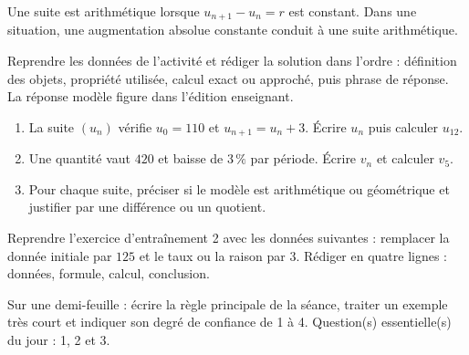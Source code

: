     \begin{traceecrite}Une suite est arithmétique lorsque $u_{n+1}-u_n=r$ est constant. Dans une situation, une augmentation absolue constante conduit à une suite arithmétique.\end{traceecrite}

    \begin{exemple}
    Reprendre les données de l'activité et rédiger la solution dans l'ordre : définition des objets, propriété utilisée, calcul exact ou approché, puis phrase de réponse. La réponse modèle figure dans l'édition enseignant.
    \end{exemple}

    \begin{exercice}[-- essentiel]
    \begin{enumerate}\item La suite $(u_n)$ vérifie $u_0=110$ et $u_{n+1}=u_n+3$. Écrire $u_n$ puis calculer $u_{12}$.\item Une quantité vaut $420$ et baisse de $3\,\%$ par période. Écrire $v_n$ et calculer $v_5$.\item Pour chaque suite, préciser si le modèle est arithmétique ou géométrique et justifier par une différence ou un quotient.\end{enumerate}
    \end{exercice}


    \begin{dm}Reprendre l'exercice d'entraînement 2 avec les données suivantes : remplacer la donnée initiale par $125$ et le taux ou la raison par $3$. Rédiger en quatre lignes : données, formule, calcul, conclusion.\end{dm}

    \begin{sortie}Sur une demi-feuille : écrire la règle principale de la séance, traiter un exemple très court et indiquer son degré de confiance de 1 à 4. Question(s) essentielle(s) du jour : 1, 2 et 3.\end{sortie}

